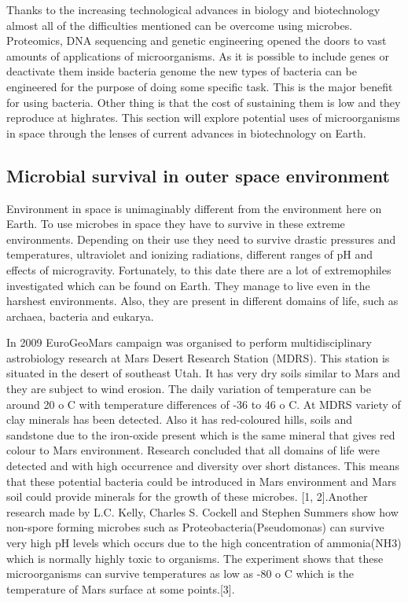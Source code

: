 \documentclass[12pt]{article}
\begin{document}
Thanks to the increasing technological advances in biology and biotechnology almost all of the difficulties mentioned can be overcome using microbes. Proteomics, DNA sequencing and genetic engineering opened the doors to vast amounts of applications of microorganisms. As it is possible to include genes or deactivate them inside bacteria genome the new types of bacteria
can be engineered for the purpose of doing some specific task. This is the major benefit for using bacteria. Other thing is that the cost of sustaining them is low and they reproduce at highrates. This section will explore potential uses of microorganisms in space through the lenses of current advances in biotechnology on Earth.

\subsection{Microbial survival in outer space environment}

Environment in space is unimaginably different from the environment here on Earth. To use microbes in space they have to survive in these extreme environments. Depending on their use they need to survive drastic pressures and temperatures, ultraviolet and ionizing radiations,
different ranges of pH and effects of microgravity. Fortunately, to this date there are a lot of extremophiles investigated which can be found on Earth. They manage to live even in the harshest environments. Also, they are present in different domains of life, such as archaea, bacteria and eukarya.

In 2009 EuroGeoMars campaign was organised to perform multidisciplinary astrobiology research at Mars Desert Research Station (MDRS). This station is situated in the desert of southeast Utah.\cite{} It has very dry soils similar to Mars and they are subject to wind erosion. The daily variation of temperature can be around 20 o C with temperature differences of -36 to 46 o C.
At MDRS variety of clay minerals has been detected. Also it has red-coloured hills, soils and sandstone due to the iron-oxide present which is the same mineral that gives red colour to Mars environment. Research concluded that all domains of life were detected and with high occurrence and diversity over short distances. This means that these potential bacteria could be introduced in Mars environment and Mars soil could provide minerals for the growth of these microbes. [1, 2].Another research made by L.C. Kelly, Charles S. Cockell and Stephen Summers show how non-spore forming microbes such as Proteobacteria(Pseudomonas) can survive very high pH levels which occurs due to the high concentration of ammonia(NH3) which is normally highly toxic to organisms. The experiment shows that these microorganisms can survive temperatures as low as -80 o C which is the temperature of Mars surface at some
points.\cite{}[3].
\end{document}
